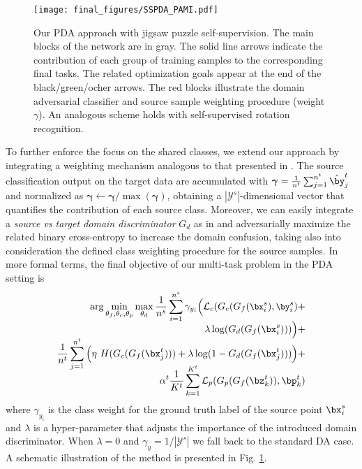 \begin{figure}[!t]
  \centering
\texttt{[image: final\_figures/SSPDA\_PAMI.pdf]}
\caption{Our PDA approach with jigsaw puzzle self-supervision. The main blocks 
of the network are in gray. The solid line arrows indicate the contribution of each group of training samples
to the corresponding final tasks. The related optimization goals appear at the end of the black/green/ocher arrows. The red blocks illustrate the domain adversarial 
classifier and source sample weighting procedure (weight $\gamma$). 
An analogous scheme holds with self-supervised rotation recognition.}\vspace{-4mm}
\label{fig:scheme}
\end{figure}

To further enforce the focus on the shared classes, we extend our approach by integrating a weighting mechanism analogous to that presented in \cite{PADA_eccv18}. The source classification output on the target data are accumulated with 
$\boldsymbol{\gamma} = \frac{1}{n^t}\sum_{j=1}^{n^t}\hat{\by}_j^t$
and normalized as $\boldsymbol{\gamma} \leftarrow \boldsymbol{\gamma}/ \max(\boldsymbol{\gamma})$, obtaining a $|\mathcal{Y}^s|$-dimensional vector that quantifies the contribution of each source class. 
Moreover, we can easily integrate a \emph{source vs target domain discriminator} $G_d$ as in \cite{Ganin:DANN:JMLR16} and adversarially maximize the related binary cross-entropy to increase the domain confusion, taking also into consideration the defined class weighting 
procedure for the source samples. In more formal terms, the final objective of our multi-task problem in the PDA setting is \vspace{-2mm}
{
\begin{align} \small 
    \arg \min_{\theta_f, \theta_c, \theta_p} \max_{\theta_d} 
    \frac{1}{n^s} \sum_{i=1}^{n^s} {\gamma_{y_i}} \Big( \mathcal{L}_c(G_c(G_f({\bx}^s_i),\by_i^s)  + \nonumber \\[-5pt] 
    \lambda \log (G_d(G_f({\bx}^s_i))) \Big)+  \nonumber \\[-5pt]
    \frac{1}{n^t} \sum_{j=1}^{n^t} \Big( \eta ~   H(G_c(G_f({\bx}^t_j))) +  
    \lambda \log (1 - G_d(G_f({\bx}^t_j)))\Big) + \nonumber \\[-10pt]
    \alpha^t \frac{1}{K^t} \sum_{k=1}^{K^t} \mathcal{L}_p(G_p(G_f({\bz}^t_k)),\bp_k^t)
    \label{equationPDA}
\end{align}}
where {$\gamma_{y_i}$ is the class weight for the ground truth label of the source point ${\bx}^s_i$} and $\lambda$ is a hyper-parameter that adjusts the importance of the introduced domain discriminator. 
When $\lambda=0$ and $\gamma_{y} = 1/|\mathcal{Y}^s| $ we fall back to the standard DA case. 
A schematic illustration of the method is presented in Fig. \ref{fig:scheme}.

